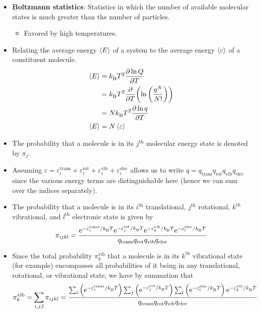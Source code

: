 \documentclass[../notes.tex]{subfiles}
\begin{document}
\begin{itemize}
\begin{itemize}
\begin{itemize}
        \end{itemize}
    \end{itemize}
    \item \textbf{Boltzmann statistics}: Statistics in which the number of available molecular states is much greater than the number of particles.
    \begin{itemize}
        \item Favored by high temperatures.
    \end{itemize}
    \item Relating the average energy $\prb{E}$ of a system to the average energy $\prb{\varepsilon}$ of a constituent molecule.
    \begin{align*}
        \prb{E} &= \kB T^2\pdv{\ln Q}{T}\\
        &= \kB T^2\pdv{T}(\ln\left( \frac{q^N}{N!} \right))\\
        &= N\kB T^2\pdv{\ln q}{T}\\
        \prb{E} &= N\prb{\varepsilon}
    \end{align*}
    \item The probability that a molecule is in its $j^\text{th}$ molecular energy state is denoted by $\pi_j$.
    \item Assuming $\varepsilon=\varepsilon_i^\text{trans}+\varepsilon_i^\text{rot}+\varepsilon_i^\text{vib}+\varepsilon_i^\text{elec}$ allows us to write $q=q_\text{trans}q_\text{rot}q_\text{vib}q_\text{elec}$ since the various energy terms are distinguishable here (hence we can sum over the indices separately).
    \item The probability that a molecule is in its $i^\text{th}$ translational, $j^\text{th}$ rotational, $k^\text{th}$ vibrational, and $l^\text{th}$ electronic state is given by
    \begin{equation*}
        \pi_{ijkl} = \frac{\e[-\varepsilon_i^\text{trans}/\kB T]\e[-\varepsilon_j^\text{rot}/\kB T]\e[-\varepsilon_k^\text{vib}/\kB T]\e[-\varepsilon_l^\text{elec}/\kB T]}{q_\text{trans}q_\text{rot}q_\text{vib}q_\text{elec}}
    \end{equation*}
    \item Since the total probability $\pi_k^\text{vib}$ that a molecule is in its $k^\text{th}$ vibrational state (for example) encompasses all probabilities of it being in any translational, rotational, or vibrational state, we have by summation that
    \begin{equation*}
        \pi_k^\text{vib} = \sum_{i,j,l}\pi_{ijkl}
        = \frac{\sum_i\left( \e[-\varepsilon_i^\text{trans}/\kB T] \right)\sum_j\left( \e[-\varepsilon_j^\text{rot}/\kB T] \right)\sum_l\left( \e[-\varepsilon_l^\text{elec}/\kB T] \right)\e[-\varepsilon_k^\text{vib}/\kB T]}{q_\text{trans}q_\text{rot}q_\text{vib}q_\text{elec}}

\end{equation*}
\end{itemize}
\end{document}
